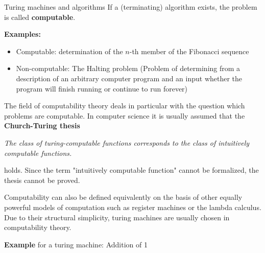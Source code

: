 \documentclass[11pt,compress,t,notes=noshow, xcolor=table]{beamer}
\begin{document}
\begin{vbframe}{Turing machines and algorithms}
If a (terminating) algorithm exists, the problem is called \textbf{computable}.

\lz

\textbf{Examples: }

\begin{itemize}
\item Computable: determination of the $n$-th member of the Fibonacci sequence
\item Non-computable: The Halting problem (Problem of determining from a description of an arbitrary computer program and an input whether the program will finish running or continue to run forever)
\end{itemize}

\framebreak

The field of computability theory deals in particular with the question which problems are computable. In computer science it is usually assumed that the \textbf{Church-Turing thesis}

\begin{center}
\begin{minipage}{0.9\textwidth}
\emph{The class of turing-computable functions corresponds to the class of intuitively computable functions. } \\
\end{minipage}
\end{center}

holds. Since the term "intuitively computable function" cannot be formalized, the thesis cannot be proved.

\vfill

\begin{footnotesize}
Computability can also be defined equivalently on the basis of other equally powerful models of computation such as register machines or the lambda calculus. Due to their structural simplicity, turing machines are usually chosen in computability theory.
\end{footnotesize}

\framebreak

\textbf{Example} for a turing machine: Addition of 1


\begin{figure}[widht=0.6\textwidth]
\end{figure}
\end{vbframe}
\end{document}

